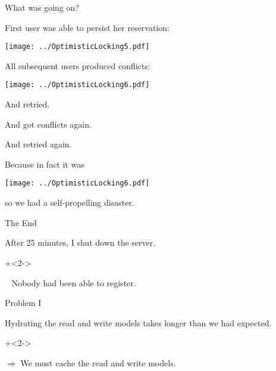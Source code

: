 \begin{frame}[fragile]{What was going on?}

First user was able to persist her reservation:

\texttt{[image: ../OptimisticLocking5.pdf]}

All subsequent users produced conflicts: 

\texttt{[image: ../OptimisticLocking6.pdf]}

And retried.

And got conflicts again.

And retried again.

\end{frame}

\begin{frame}[fragile]{}

Because in fact it was

\texttt{[image: ../OptimisticLocking6.pdf]}

so we had a self-propelling disaster.

\end{frame}

\begin{frame}[fragile]{The End}

After 25 minutes, I shut down the server.
                  
\onslide+<2->
                  
\vspace{3em}

~ \hspace{10em} Nobody had been able to register.
                  
\end{frame}

\begin{frame}[fragile]{Problem I}

Hydrating the read and write models takes longer than we had expected.
                  
\onslide+<2->
                  
\vspace{3em}

$\Longrightarrow$ We must cache the read and write models.
                  
\end{frame}


